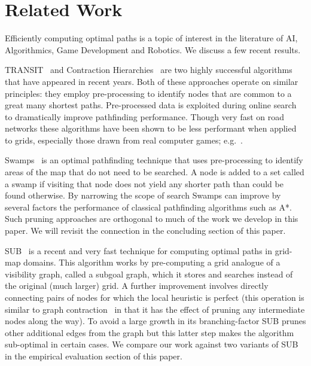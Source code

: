 \section{Related Work}
\label{sec::relatedwork}
Efficiently computing optimal paths is a topic of interest in the literature
of AI, Algorithmics, Game Development and Robotics. We discuss a few recent
results.

TRANSIT~\cite{bast06} and Contraction Hierarchies~\cite{geisberger08} are two
highly successful algorithms that have appeared in recent years.
Both of these approaches operate on similar principles: they
employ pre-processing to identify nodes that are common to a great many
shortest paths. Pre-processed data is exploited during online search to
dramatically improve pathfinding performance. Though very fast on road networks
these algorithms have been shown to be less performant when applied to grids,
especially those drawn from real computer games;
e.g.~\cite{sturtevant10,antsfeld12,storandt13}.

Swamps~\cite{pochter10} is an optimal pathfinding technique that uses
pre-processing to identify areas of the map that do not need to be searched. A
node is added to a set called a swamp if visiting that node does not yield any
shorter path than could be found otherwise. By narrowing the scope of search
Swamps can improve by several factors the performance of classical pathfinding
algorithms such as A{*}.  Such pruning approaches are orthogonal to much of
the work we develop in this paper. We will revisit the connection in the 
concluding section of this paper.

SUB~\cite{urasKH13} is a recent and very fast technique for computing optimal
paths in grid-map domains.  This algorithm works by pre-computing a grid
analogue of a visibility graph, called a subgoal graph, which it stores and
searches instead of the original (much larger) grid.  A further improvement
involves directly connecting pairs of nodes for which the local heuristic is
perfect (this operation is similar to graph contraction~\cite{geisberger08} in
that it has the effect of pruning any intermediate nodes along the way).  To
avoid a large growth in its branching-factor SUB prunes other additional edges
from the graph but this latter step makes the algorithm sub-optimal in certain
cases. We compare our work against two variants of SUB in the empirical
evaluation section of this paper.

%
